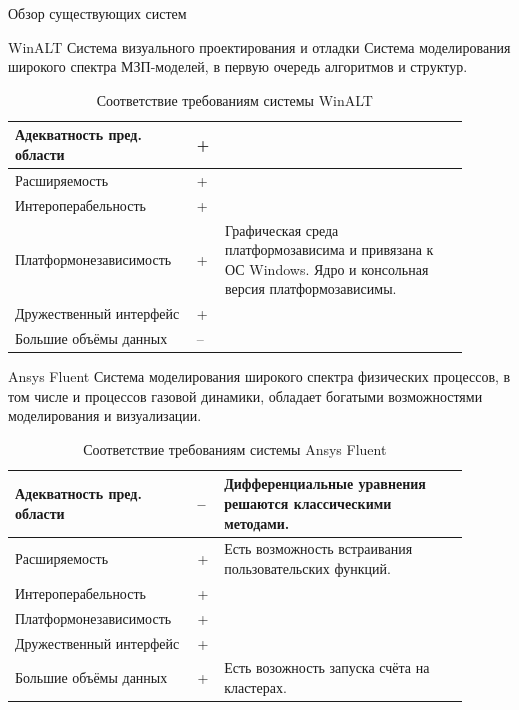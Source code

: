 \documentclass[a4paper,12pt]{extarticle}
\begin{document}
\begin{section}{Обзор существующих систем}
\begin{subsection}{WinALT}
    Система визуального проектирования и отладки
    Система моделирования широкого спектра МЗП-моделей, в первую очередь алгоритмов и структур.
    \newpage
    
    \begin{table}[h]
        \caption{Соответствие требованиям системы WinALT}
        \label{tabular:winalt}
        \begin{center}
            \begin{tabular}{|p{0.35\linewidth}|p{0.05\linewidth}|p{0.5\linewidth}|} \hline
                Адекватность пред. области & + & \\ \hline
                Расширяемость              & + & \\ \hline
                Интероперабельность        & + & \\ \hline
                Платформонезависимость     & + & Графическая среда платформозависима и привязана к ОС Windows. Ядро и консольная версия платформозависимы. \\ \hline
                Дружественный интерфейс    & + & \\ \hline
                Большие объёмы данных      & -- & \\ \hline            
            \end{tabular}
        \end{center}
    \end{table}
\end{subsection}

\begin{subsection}{Ansys Fluent}
    Система моделирования широкого спектра физических процессов, в том числе и процессов газовой динамики, обладает богатыми возможностями моделирования и визуализации.

    \begin{table}[h]
        \caption{Соответствие требованиям системы Ansys Fluent}
        \label{tabular:ansysfluent}
        \begin{center}
            \begin{tabular}{|p{0.35\linewidth}|p{0.05\linewidth}|p{0.5\linewidth}|} \hline
                Адекватность пред. области & -- & Дифференциальные уравнения решаются классическими методами. \\ \hline
                Расширяемость              & + & Есть возможность встраивания пользовательских функций. \\ \hline
                Интероперабельность        & + & \\ \hline
                Платформонезависимость     & + & \\ \hline
                Дружественный интерфейс    & + & \\ \hline
                Большие объёмы данных      & + & Есть возожность запуска счёта на кластерах. \\ \hline
            \end{tabular}
        \end{center}
    \end{table}
\end{subsection}


\end{section}
\end{document}
